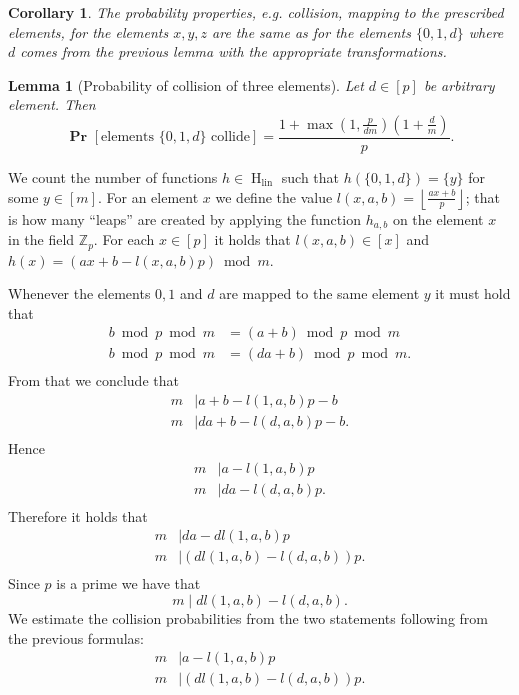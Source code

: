 \documentclass{article}
\newcommand{\hlin}{\operatorname{H}_{\operatorname{lin}}}
\newcommand{\probs}[2]{\operatorname{\mathbf{Pr}}_{{#1}}\left[{#2}\right]}
\newcommand{\prob}[1]{\probs{}{#1}}
\newtheorem{lemma}{Lemma}
\newtheorem{corollary}{Corollary}
\begin{document}
\begin{corollary}
The probability properties, e.g. collision, mapping to the prescribed elements, for the elements $x, y, z$ are the same as for the elements $\{0, 1, d\}$ where $d$ comes from the previous lemma with the appropriate transformations.
\end{corollary}

\begin{lemma}[Probability of collision of three elements]
Let $d \in [p]$ be arbitrary element. Then
\[
\prob{\mbox{elements }\{0, 1, d\}\mbox{ collide}} = 
\frac{1 + \max\left(1, \frac{p}{dm}\right)\left(1 + \frac{d}{m}\right)}{p}.
\]
\end{lemma}

We count the number of functions $h \in \hlin$ such that $h(\{0, 1, d\}) = \{y\}$ for some $y \in [m]$.
For an element $x$ we define the value $l(x, a, b) = \left\lfloor\frac{ax + b}{p}\right\rfloor$; that is how many ``leaps'' are created by applying the function $h_{a, b}$ on the element $x$ in the field $\mathbb{Z}_p$.
For each $x \in [p]$ it holds that $l(x, a, b) \in [x]$ and $h(x) = (ax + b - l(x, a, b)p) \bmod m$.

Whenever the elements $0, 1$ and $d$ are mapped to the same element $y$ it must hold that 
\begin{align*}
	b \bmod p \bmod m & = (a + b) \bmod p \bmod m \\
	b \bmod p \bmod m & = (da + b) \bmod p \bmod m. \\
\end{align*}
From that we conclude that
\begin{align*}
	m & \mid a + b - l(1, a, b)p - b \\
	m & \mid da + b - l(d, a, b)p - b. \\
\end{align*}
Hence
\begin{align*}
	m & \mid a - l(1, a, b)p \\
	m & \mid da - l(d, a, b)p. \\
\end{align*}
Therefore it holds that 
\begin{align*}
	m & \mid da - dl(1, a, b)p \\
	m & \mid (dl(1, a, b) - l(d, a, b))p. \\
\end{align*}
Since $p$ is a prime we have that \[m \mid dl(1, a, b) - l(d, a, b).\]
We estimate the collision probabilities from the two statements following from the previous formulas:
\begin{align}
	m & \mid a - l(1, a, b)p \label{3-prob-1-statement} \\
	m & \mid (dl(1, a, b) - l(d, a, b))p. \label{3-prob-2-statement}
\end{align}
\end{document}
